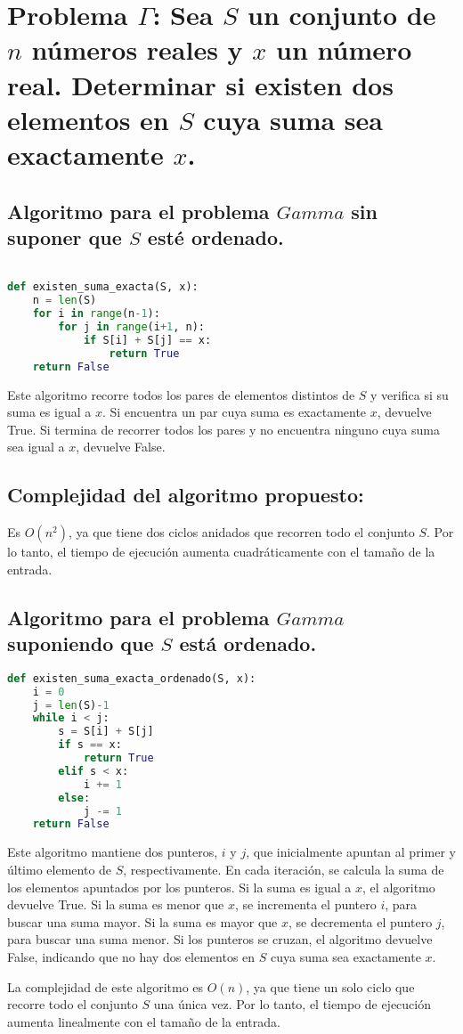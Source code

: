 \section{\textbf{Problema $\Gamma$:} Sea $S$ un conjunto de $n$ números reales y $x$ un número real. Determinar si existen dos elementos en $S$ cuya suma sea exactamente $x$.}

\subsection{Algoritmo para el problema $Gamma$ sin suponer que $S$ esté ordenado.}
\begin{lstlisting}[language=python]

def existen_suma_exacta(S, x):
    n = len(S)
    for i in range(n-1):
        for j in range(i+1, n):
            if S[i] + S[j] == x:
                return True
    return False


\end{lstlisting}

Este algoritmo recorre todos los pares de elementos distintos de $S$ y verifica si su suma es igual a $x$. Si encuentra un par cuya suma es exactamente $x$, devuelve True. Si termina de recorrer todos los pares y no encuentra ninguno cuya suma sea igual a $x$, devuelve False.

\subsection{Complejidad del algoritmo propuesto:}

Es $O(n^2)$, ya que tiene dos ciclos anidados que recorren todo el conjunto $S$. Por lo tanto, el tiempo de ejecución aumenta cuadráticamente con el tamaño de la entrada.

\subsection{Algoritmo para el problema $Gamma$ suponiendo que $S$ está ordenado.}

\begin{lstlisting}[language=python]  
def existen_suma_exacta_ordenado(S, x):
    i = 0
    j = len(S)-1
    while i < j:
        s = S[i] + S[j]
        if s == x:
            return True
        elif s < x:
            i += 1
        else:
            j -= 1
    return False
\end{lstlisting}

Este algoritmo mantiene dos punteros, $i$ y $j$, que inicialmente apuntan al primer y último elemento de $S$, respectivamente. En cada iteración, se calcula la suma de los elementos apuntados por los punteros. Si la suma es igual a $x$, el algoritmo devuelve True. Si la suma es menor que $x$, se incrementa el puntero $i$, para buscar una suma mayor. Si la suma es mayor que $x$, se decrementa el puntero $j$, para buscar una suma menor. Si los punteros se cruzan, el algoritmo devuelve False, indicando que no hay dos elementos en $S$ cuya suma sea exactamente $x$.

La complejidad de este algoritmo es $O(n)$, ya que tiene un solo ciclo que recorre todo el conjunto $S$ una única vez. Por lo tanto, el tiempo de ejecución aumenta linealmente con el tamaño de la entrada.
